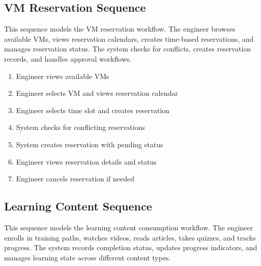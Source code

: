 
\subsection{VM Reservation Sequence}
This sequence models the VM reservation workflow. The engineer browses
available VMs, views reservation calendars, creates time-based reservations,
and manages reservation status. The system checks for conflicts, creates
reservation records, and handles approval workflows.

\begin{enumerate}[topsep=0pt,itemsep=1pt,parsep=0pt,partopsep=0pt]
    \item Engineer views available VMs
    \item Engineer selects VM and views reservation calendar
    \item Engineer selects time slot and creates reservation
    \item System checks for conflicting reservations
    \item System creates reservation with pending status
    \item Engineer views reservation details and status
    \item Engineer cancels reservation if needed
\end{enumerate}


\subsection{Learning Content Sequence}
This sequence models the learning content consumption workflow. The engineer
enrolls in training paths, watches videos, reads articles, takes quizzes, and
tracks progress. The system records completion status, updates progress
indicators, and manages learning state across different content types.

